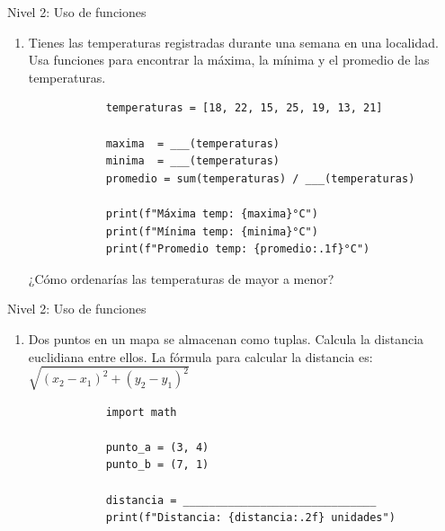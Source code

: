 \documentclass{beamer}
\begin{document}
    \begin{frame}[fragile, t]{Nivel 2: Uso de funciones}
        \begin{enumerate}
            \item[4.] Tienes las temperaturas registradas durante una semana en una localidad. 
            Usa funciones para encontrar la máxima, la mínima y el promedio de las temperaturas.
            \begin{verbatim}
            temperaturas = [18, 22, 15, 25, 19, 13, 21]
            
            maxima  = ___(temperaturas)
            minima  = ___(temperaturas)
            promedio = sum(temperaturas) / ___(temperaturas)
            
            print(f"Máxima temp: {maxima}°C")
            print(f"Mínima temp: {minima}°C")
            print(f"Promedio temp: {promedio:.1f}°C")
            \end{verbatim}
            ¿Cómo ordenarías las temperaturas de mayor a menor?
        \end{enumerate}
    \end{frame}

    \begin{frame}[fragile, t]{Nivel 2: Uso de funciones}
        \begin{enumerate}
            \item[5.] Dos puntos en un mapa se almacenan como tuplas. Calcula la distancia euclidiana entre ellos. 
            La fórmula para calcular la distancia es: $\sqrt{(x_2-x_1)^{2} + (y_2-y_1)^{2}}$
            \begin{verbatim}
            import math

            punto_a = (3, 4)
            punto_b = (7, 1)
            
            distancia = ______________________________
            print(f"Distancia: {distancia:.2f} unidades")
            \end{verbatim}
        \end{enumerate}
    \end{frame}
\end{document}
